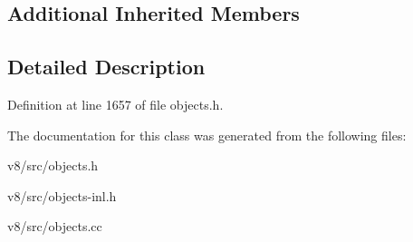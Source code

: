 \subsection*{Additional Inherited Members}


\subsection{Detailed Description}


Definition at line 1657 of file objects.\+h.



The documentation for this class was generated from the following files\+:\begin{DoxyCompactItemize}
\item 
v8/src/objects.\+h\item 
v8/src/objects-\/inl.\+h\item 
v8/src/objects.\+cc\end{DoxyCompactItemize}
